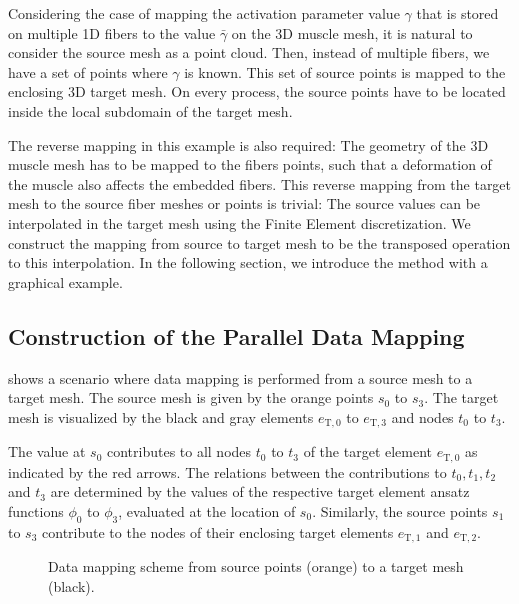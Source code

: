 Considering the case of mapping the activation parameter value $\gamma$ that is stored on multiple 1D fibers to the value $\bar{\gamma}$ on the 3D muscle mesh, it is natural to consider the source mesh as a point cloud. Then, instead of multiple fibers, we have a set of points where $\gamma$ is known. This set of source points is mapped to the enclosing 3D target mesh. On every process, the source points have to be located inside the local subdomain of the target mesh.

The reverse mapping in this example is also required: The geometry of the 3D muscle mesh has to be mapped to the fibers points, such that a deformation of the muscle also affects the embedded fibers. This reverse mapping from the target mesh to the source fiber meshes or points is trivial: The source values can be interpolated in the target mesh using the Finite Element discretization.
We construct the mapping from source to target mesh to be the transposed operation to this interpolation. In the following section, we introduce the method with a graphical example.

\subsection{Construction of the Parallel Data Mapping}

 shows a scenario where data mapping is performed from a source mesh to a target mesh. The source mesh is given by the orange points $s_0$ to $s_3$. The target mesh is visualized by the black and gray elements $e_{\text{T},0}$ to $e_{\text{T},3}$  and nodes $t_0$ to $t_3$.

The value at $s_0$ contributes to all nodes $t_0$ to $t_3$ of the target element $e_{\text{T},0}$ as indicated by the red arrows. The relations between the contributions to $t_0,t_1,t_2$ and $t_3$ are determined by the values of the respective target element ansatz functions $\phi_0$ to $\phi_3$, evaluated at the location of $s_0$.
Similarly, the source points $s_1$ to $s_3$ contribute to the nodes of their enclosing target elements $e_{\text{T},1}$ and $e_{\text{T},2}$. 

\begin{figure}%
  \centering%
  \def\svgwidth{0.4\textwidth}
  \caption{Data mapping scheme from source points (orange) to a target mesh (black).}%
  \label{fig:mapping_between_meshes_2}%
\end{figure}%

